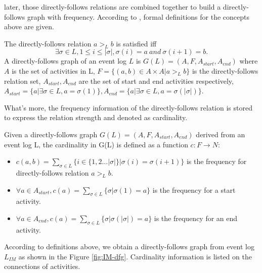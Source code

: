 later, those directly-follows relations are combined together to build a directly-follows graph with frequency. According to \cite{van2016data, leemans2013discovering}, formal definitions for the concepts above are given.
\begin{definition}
 The directly-follows relation $a >_L b$ is satisfied iff \[\exists\sigma \in L, 1 \leq i \leq \vert \sigma \vert , \sigma(i)=a \ and \ \sigma(i+1)=b.\]
 A directly-follows graph of an event log $L$ is $G(L) = (A, F , A_{start}, A_{end}) $ where $A$ is the set of activities in L, $ F=\{ (a,b) \in A \times A | a >_L b \} $ is the directly-follows relation set, $A_{start}, A_{end}$ are the set of start and end activities respectively, $A_{start}=\{a\vert \exists \sigma \in L, a=\sigma(1)\}, A_{end}=\{a\vert \exists \sigma \in L, a=\sigma(\vert \sigma\vert)\}$.
\end{definition}
What's more, the frequency information of the directly-follows relation is stored to express the relation strength and denoted as cardinality. 
\begin{definition}
Given a directly-follows graph $G(L)=(A, F , A_{start}, A_{end})$ derived from an event log L, the cardinality in G(L) is defined as a function $c: F \rightarrow N$:  
	\begin{itemize}
		\itemsep0em
		\item $c(a,b)=\sum_{\sigma \in L} \{ i\in \{1,2...|\sigma|\} \vert \sigma(i)=\sigma(i+1)\} $ is the frequency for directly-follows relation $a>_L b$. 
		\item $\forall a \in A_{start}, c(a)=\sum_{\sigma \in L} \{\sigma \vert \sigma(1) = a\}$ is the frequency for a start activity.
		\item $\forall a \in A_{end}, c(a)=\sum_{\sigma \in L} \{\sigma \vert \sigma(|\sigma|) = a\}$ is the frequency for an end activity.
	\end{itemize}	
\end{definition}
According to definitions above, we obtain a directly-follows graph from event log $L_{IM}$ as shown in the Figure \ref{fig:IM-dfg}. Cardinality information is listed on the connections of activities.
